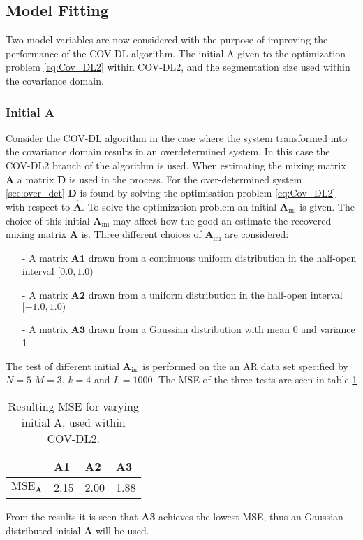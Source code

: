 \subsection{Model Fitting}
Two model variables are now considered with the purpose of improving the performance of the COV-DL algorithm. The initial A given to the optimization problem \eqref{eq:Cov_DL2} within COV-DL2, and the segmentation size used within the covariance domain.   
\subsubsection*{Initial $\textbf{A}$}
Consider the COV-DL algorithm in the case where the system transformed into the covariance domain results in an overdetermined system. In this case the COV-DL2 branch of the algorithm is used. 
When estimating the mixing matrix $\mathbf{A}$ a matrix $\mathbf{D}$ is used in the process. For the over-determined system \ref{sec:over_det} $\mathbf{D}$ is found by solving the optimisation problem \eqref{eq:Cov_DL2} with respect to $\hat{\textbf{A}}$. To solve the optimization problem an initial $\mathbf{A}_{\text{ini}}$ is given. The choice of this initial $\mathbf{A}_{\text{ini}}$ may affect how the good an estimate the recovered mixing matrix $\mathbf{A}$ is.
Three different choices of $\mathbf{A}_{\text{ini}}$ are considered:
\begin{itemize}
\item[-] A matrix $\mathbf{A1}$ drawn from a continuous uniform distribution in the half-open interval $[0.0, 1.0)$
\item[-] A matrix $\mathbf{A2}$ drawn from a uniform distribution in the half-open interval $[-1.0, 1.0)$
\item[-] A matrix $\mathbf{A3}$ drawn from a Gaussian distribution with mean 0 and variance 1
\end{itemize}
The test of different initial $\mathbf{A}_{\text{ini}}$ is performed on the 
an AR data set specified by $N=5$ $M = 3$, $k = 4$ and $L = 1000$. 
The MSE of the three tests are seen in table \ref{tab:iniA} 
\begin{table}[H]
\centering
\begin{tabular}{|l|l|l|l|} 
\hline
                          & \textbf{A1} & \textbf{A2} & \textbf{A3} \\
\hline $\text{MSE}_{\mathbf{A}}$ &   2.15          & 2.00            & 1.88\\
\hline           
\end{tabular}
\caption{Resulting MSE for varying initial A, used within COV-DL2.}
\label{tab:iniA}
\end{table}
From the results it is seen that \textbf{A3} achieves the lowest MSE, thus an Gaussian distributed initial $\textbf{A}$ will be used.    

